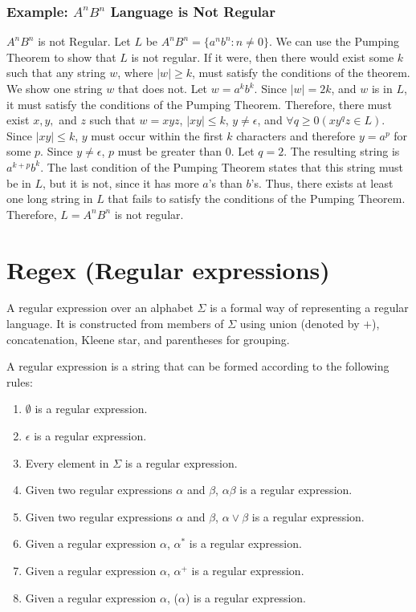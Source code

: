 \documentclass[hidelinks,12pt]{article}
\begin{document}
\subsubsection{Example: $A^nB^n$ Language is Not Regular }

$A^nB^n$ is not Regular. Let $L$ be $A^nB^n = \{a^nb^n : n \neq 0\}$. We can
use the Pumping Theorem to show that $L$ is not regular. If it were, then there
would exist some $k$ such that any string $w$, where $|w| \geq k$, must satisfy
the conditions of the theorem. We show one string $w$ that does not. Let $w =
a^kb^k$. Since $|w| = 2k$, and $w$ is in $L$, it must satisfy the conditions of
the Pumping Theorem. Therefore, there must exist $x, y,$ and $z$ such that $w =
xyz$, $|xy| \leq k$, $y \neq \epsilon$, and $\forall q \geq 0 (xy^qz \in L)$.
Since $|xy| \leq k$, $y$ must occur within the first $k$ characters and
therefore $y = a^p$ for some $p$. Since $y \neq \epsilon$, $p$ must be greater
than $0$. Let $q = 2$. The resulting string is $a^{k+p}b^k$. The last condition
of the Pumping Theorem states that this string must be in $L$, but it is not,
since it has more $a$’s than $b$’s. Thus, there exists at least one long string
in $L$ that fails to satisfy the conditions of the Pumping Theorem. Therefore,
$L = A^nB^n$ is not regular.


\section{Regex (Regular expressions)}

A regular expression over an alphabet $\Sigma$ is a formal way of representing
a regular language. It is constructed from members of $\Sigma$ using union
(denoted by $+$), concatenation, Kleene star, and parentheses for grouping.

A regular expression is a string that can be formed according to the following rules:
\begin{enumerate}
	\item $\emptyset$ is a regular expression.
	\item $\epsilon$ is a regular expression.
	\item Every element in $\Sigma$ is a regular expression.
	\item Given two regular expressions $\alpha$ and $\beta$, $\alpha\beta$ is a regular expression.
	\item Given two regular expressions $\alpha$ and $\beta$, $\alpha \lor \beta$ is a regular expression.
	\item Given a regular expression $\alpha$, $\alpha^*$ is a regular expression.
	\item Given a regular expression $\alpha$, $\alpha^+$ is a regular expression.
	\item Given a regular expression $\alpha$, ($\alpha$) is a regular expression.
\end{enumerate}
\end{document}
